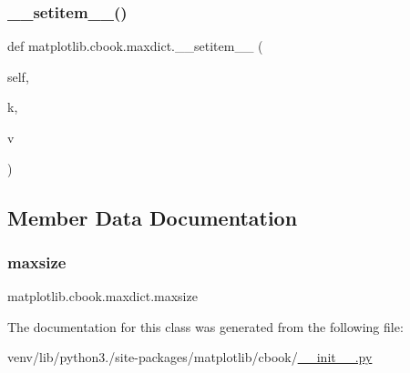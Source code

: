 \subsubsection{\texorpdfstring{\+\_\+\+\_\+setitem\+\_\+\+\_\+()}{\_\_setitem\_\_()}}
{\footnotesize\ttfamily def matplotlib.\+cbook.\+maxdict.\+\_\+\+\_\+setitem\+\_\+\+\_\+ (\begin{DoxyParamCaption}\item[{}]{self,  }\item[{}]{k,  }\item[{}]{v }\end{DoxyParamCaption})}



\subsection{Member Data Documentation}
\mbox{\label{classmatplotlib_1_1cbook_1_1maxdict_aa4b1f94140adaf6e8833aca516b3e297}} 
\subsubsection{\texorpdfstring{maxsize}{maxsize}}
{\footnotesize\ttfamily matplotlib.\+cbook.\+maxdict.\+maxsize}



The documentation for this class was generated from the following file\+:\begin{DoxyCompactItemize}
\item 
venv/lib/python3./site-\/packages/matplotlib/cbook/\hyperlink{venv_2lib_2python3_89_2site-packages_2matplotlib_2cbook_2____init_____8py}{\+\_\+\+\_\+init\+\_\+\+\_\+.\+py}\end{DoxyCompactItemize}
